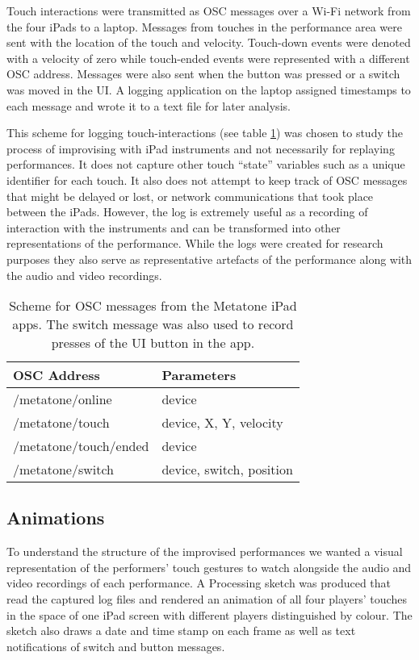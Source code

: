 \documentclass{chi-ext}
\begin{document}
Touch interactions were transmitted as OSC
messages over a Wi-Fi network from the four iPads to a laptop. 
Messages from touches in the performance area
were sent with the location of the touch and velocity. Touch-down
events were denoted with a velocity of zero while touch-ended events
were represented with a different OSC address. Messages were also sent
when the button was pressed or a switch was moved in the UI. A logging application
on the laptop assigned timestamps to each message and wrote
it to a text file for later analysis. 

This scheme for logging touch-interactions (see table \ref{oscschema}) was chosen to study the
process of improvising with iPad instruments and not necessarily for
replaying performances. It does not capture other touch ``state'' variables
such as a unique identifier for each touch. It also does not attempt
to keep track of OSC messages that might be delayed or lost, or
network communications that took place between the iPads.
However, the log is extremely useful as a recording of interaction
with the instruments and can be transformed into other representations
of the performance. While the logs were created for research purposes
they also serve as representative artefacts of the performance along
with the audio and video recordings.

\begin{table}
  \begin{tabular}{|l|l|}
  \hline
  OSC Address           & Parameters \\ \hline
  /metatone/online      & device  \\     
  /metatone/touch       & device, X, Y, velocity \\
  /metatone/touch/ended & device \\  
  /metatone/switch      & device, switch, position\\ \hline
  \end{tabular}
  \caption{Scheme for OSC messages from the Metatone iPad apps. The
    switch message was also used to record presses of the UI button in
    the app.}
  \label{oscschema} 
\end{table}

\subsection{Animations}

To understand the structure of the improvised performances we wanted a
visual representation of the performers' touch gestures to watch
alongside the audio and video recordings of each performance. A
Processing sketch was produced that read the captured log files and
rendered an animation of all four players' touches in the space of one
iPad screen with different players distinguished by colour. The sketch
also draws a date and time stamp on each frame as well as text
notifications of switch and button messages.
\end{document}
